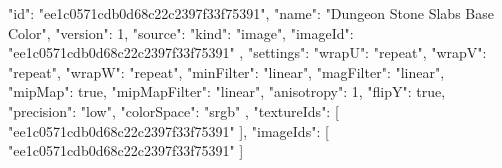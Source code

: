 {
  "id": "ee1c0571cdb0d68c22c2397f33f75391",
  "name": "Dungeon Stone Slabs Base Color",
  "version": 1,
  "source": {
    "kind": "image",
    "imageId": "ee1c0571cdb0d68c22c2397f33f75391"
  },
  "settings": {
    "wrapU": "repeat",
    "wrapV": "repeat",
    "wrapW": "repeat",
    "minFilter": "linear",
    "magFilter": "linear",
    "mipMap": true,
    "mipMapFilter": "linear",
    "anisotropy": 1,
    "flipY": true,
    "precision": "low",
    "colorSpace": "srgb"
  },
  "textureIds": [
    "ee1c0571cdb0d68c22c2397f33f75391"
  ],
  "imageIds": [
    "ee1c0571cdb0d68c22c2397f33f75391"
  ]
}
